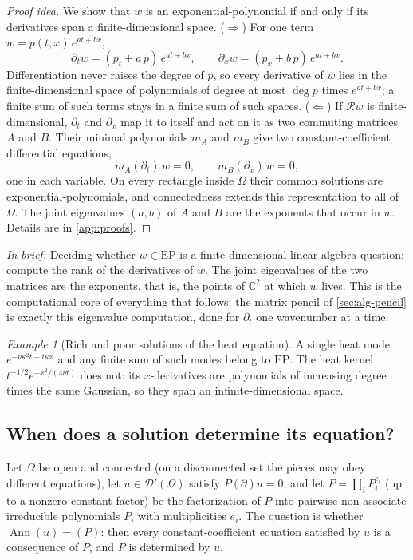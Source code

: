 \documentclass[11pt]{article}
\theoremstyle{plain}
\theoremstyle{definition}
\theoremstyle{remark}
\newtheorem{example}[theorem]{Example}
\newcommand{\C}{\mathbb{C}}
\newcommand{\ring}{\mathcal{R}}            %
\DeclareMathOperator{\Ann}{Ann}             %
\newcommand{\EP}{\mathrm{EP}}               %
\newcommand{\inbrief}[1]{\par\smallskip\noindent\emph{In brief.} #1\par\smallskip}
\begin{document}
\begin{proof}[Proof idea]
We show that $w$ is an exponential-polynomial if and only if its derivatives span a finite-dimensional
space. ($\Rightarrow$) For one term $w=p(t,x)\,e^{at+bx}$,
\[
  \partial_tw=(p_t+a\,p)\,e^{at+bx},\qquad \partial_xw=(p_x+b\,p)\,e^{at+bx}.
\]
Differentiation never raises the degree of $p$, so every derivative of $w$ lies in the finite-dimensional space
of polynomials of degree at most $\deg p$ times $e^{at+bx}$; a finite sum of such terms stays in a finite sum of
such spaces. ($\Leftarrow$) If $\ring w$ is finite-dimensional, $\partial_t$ and $\partial_x$ map it to itself and act
on it as two commuting matrices $A$ and $B$. Their minimal polynomials $m_A$ and $m_B$ give two
constant-coefficient differential equations,
\[
  m_A(\partial_t)\,w=0,\qquad m_B(\partial_x)\,w=0,
\]
one in each variable. On every rectangle inside $\Omega$ their common solutions are exponential-polynomials, and
connectedness extends this representation to all of $\Omega$. The joint eigenvalues $(a,b)$ of $A$ and $B$ are
the exponents that occur in $w$. Details are in \cref{app:proofs}.
\end{proof}

\inbrief{Deciding whether $w\in\EP$ is a finite-dimensional linear-algebra question: compute the rank
of the derivatives of $w$. The joint eigenvalues of the two matrices are the exponents, that is, the
points of $\C^2$ at which $w$ lives. This is the computational core of everything that follows: the
matrix pencil of \cref{sec:alg-pencil} is exactly this eigenvalue computation, done for $\partial_t$
one wavenumber at a time.}

\begin{example}[Rich and poor solutions of the heat equation]\label{ex:heat-rich-poor}
A single heat mode $e^{-\nu\kappa^2t+i\kappa x}$ and any finite sum of such modes belong to $\EP$.
The heat kernel $t^{-1/2}e^{-x^2/(4\nu t)}$ does not: its $x$-derivatives are polynomials of
increasing degree times the same Gaussian, so they span an infinite-dimensional space.
\end{example}



\subsection{When does a solution determine its equation?}\label{sec:ident}
Let $\Omega$ be open and connected (on a disconnected set the pieces may obey different equations),
let $u\in\mathcal D'(\Omega)$ satisfy $P(\partial)u=0$, and let $P=\prod_iP_i^{e_i}$ (up to a nonzero constant factor) be the
factorization of $P$ into pairwise non-associate irreducible polynomials $P_i$ with multiplicities
$e_i$. The question is whether $\Ann(u)=(P)$: then every constant-coefficient equation satisfied by
$u$ is a consequence of $P$, and $P$ is determined by $u$.
\end{document}
